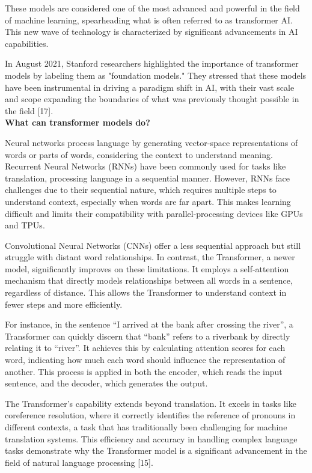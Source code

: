 These models are considered one of the most advanced and powerful in the field of machine learning, spearheading what is often referred to as transformer AI. This new wave of technology is characterized by significant advancements in AI capabilities.

In August 2021, Stanford researchers highlighted the importance of transformer models by labeling them as "foundation models." They stressed that these models have been instrumental in driving a paradigm shift in AI, with their vast scale and scope expanding the boundaries of what was previously thought possible in the field [17]. \\


\textbf{What can transformer models do?}


Neural networks process language by generating vector-space representations of words or parts of words, considering the context to understand meaning. Recurrent Neural Networks (RNNs) have been commonly used for tasks like translation, processing language in a sequential manner. However, RNNs face challenges due to their sequential nature, which requires multiple steps to understand context, especially when words are far apart. This makes learning difficult and limits their compatibility with parallel-processing devices like GPUs and TPUs.

Convolutional Neural Networks (CNNs) offer a less sequential approach but still struggle with distant word relationships. In contrast, the Transformer, a newer model, significantly improves on these limitations. It employs a self-attention mechanism that directly models relationships between all words in a sentence, regardless of distance. This allows the Transformer to understand context in fewer steps and more efficiently.

For instance, in the sentence “I arrived at the bank after crossing the river”, a Transformer can quickly discern that “bank” refers to a riverbank by directly relating it to “river”. It achieves this by calculating attention scores for each word, indicating how much each word should influence the representation of another. This process is applied in both the encoder, which reads the input sentence, and the decoder, which generates the output.

The Transformer's capability extends beyond translation. It excels in tasks like coreference resolution, where it correctly identifies the reference of pronouns in different contexts, a task that has traditionally been challenging for machine translation systems. This efficiency and accuracy in handling complex language tasks demonstrate why the Transformer model is a significant advancement in the field of natural language processing [15].




